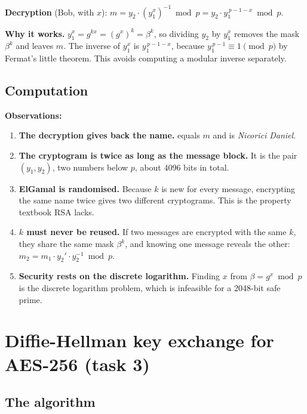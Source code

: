 \documentclass[11pt,a4paper]{article}
\begin{document}
\textbf{Decryption} (Bob, with $x$): $m = y_2 \cdot (y_1^{x})^{-1} \bmod p = y_2 \cdot y_1^{\,p-1-x} \bmod p$.

\textbf{Why it works.} $y_1^{x} = g^{k x} = (g^{x})^{k} = \beta^{k}$, so dividing $y_2$ by
$y_1^{x}$ removes the mask $\beta^{k}$ and leaves $m$. The inverse of $y_1^{x}$ is $y_1^{\,p-1-x}$,
because $y_1^{\,p-1} \equiv 1 \pmod p$ by Fermat's little theorem. This avoids computing a modular
inverse separately.

\subsection{Computation}




\textbf{Observations:}
\begin{enumerate}
  \item \textbf{The decryption gives back the name.}  equals $m$ and
   is \textit{Nicorici Daniel}.
  \item \textbf{The cryptogram is twice as long as the message block.} It is the pair
  $(y_1, y_2)$, two numbers below $p$, about 4096 bits in total.
  \item \textbf{ElGamal is randomised.} Because $k$ is new for every message, encrypting the same
  name twice gives two different cryptograms. This is the property textbook RSA lacks.
  \item \textbf{$k$ must never be reused.} If two messages are encrypted with the same $k$, they
  share the same mask $\beta^{k}$, and knowing one message reveals the other:
  $m_2 = m_1 \cdot y_2' \cdot y_2^{-1} \bmod p$.
  \item \textbf{Security rests on the discrete logarithm.} Finding $x$ from $\beta = g^{x} \bmod p$
  is the discrete logarithm problem, which is infeasible for a 2048-bit safe prime.
\end{enumerate}

\section{Diffie-Hellman key exchange for AES-256 (task 3)}

\subsection{The algorithm}
\end{document}
